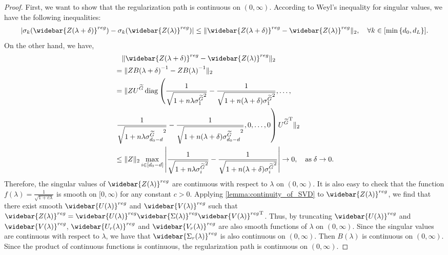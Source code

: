 \documentclass{article}
\newcommand{\T}{\mathrm{T}}
\theoremstyle{plain}
\theoremstyle{definition}
\theoremstyle{remark}
\theoremstyle{remark}
\begin{document}
\begin{proof}
      First, we want to show that the regularization path is continuous on $(0, \infty)$. According to Weyl's inequality for singular values, we have the following inequalities:
      \begin{align}
        |\sigma_k(\widebar{Z(\lambda+\delta)}^{reg})-\sigma_k(\widebar{Z(\lambda)}^{reg})| \leq \|\widebar{Z(\lambda+\delta)}^{reg}-\widebar{Z(\lambda)}^{reg}\|_{2}, \quad \forall k \in [\min{\{d_0, d_L\}}].
      \end{align}
      On the other hand, we have,
      \begin{align}
        &\quad \|\widebar{Z(\lambda+\delta)}^{reg}-\widebar{Z(\lambda)}^{reg}\|_{2} \\
        &= \|Z{B(\lambda+\delta)}^{-1}-Z{B(\lambda)}^{-1}\|_{2} \\
        &=  \|Z U^{\widetilde{G}} \operatorname*{diag}\left(\frac{1}{\sqrt{1+n\lambda {\sigma_1^{\widetilde{G}}}^2}}-\frac{1}{\sqrt{1+n(\lambda+\delta){\sigma_1^{\widetilde{G}}}^2}}, \dots, \right.\\
        & \left. \frac{1}{\sqrt{1+n\lambda {\sigma_{d_0-d}^{\widetilde{G}}}^2}}-\frac{1}{\sqrt{1+n(\lambda+\delta){\sigma_{d_0-d}^{\widetilde{G}}}^2}} , 0, \dots, 0\right) {U^{\widetilde{G}}}^{\T} \|_{2} \\
        &\leq \|Z\|_{2} \max_{i \in [d_0-d]} \left|\frac{1}{\sqrt{1+n\lambda {\sigma_i^{\widetilde{G}}}^2}}-\frac{1}{\sqrt{1+n(\lambda+\delta){\sigma_i^{\widetilde{G}}}^2}}\right| \rightarrow 0, \quad \text{as} \; \delta \rightarrow 0.
      \end{align}
      Therefore, the singular values of $\widebar{Z(\lambda)}^{reg}$ are continuous with respect to $\lambda$ on $(0, \infty)$. It is also easy to check that the function $f(\lambda) = \frac{1}{\sqrt{1+c\lambda}}$ is smooth on $[0, \infty)$ for any constant $c > 0$. Applying \autoref{lemma:continuity_of_SVD} to $\widebar{Z(\lambda)}^{reg}$, we find that there exist smooth $\widebar{U(\lambda)}^{reg}$ and $\widebar{V(\lambda)}^{reg}$ such that $\widebar{Z(\lambda)}^{reg} = \widebar{U(\lambda)}^{reg} \widebar{\Sigma(\lambda)}^{reg} {\widebar{V(\lambda)}^{reg}}^{\T}$. Thus, by truncating $\widebar{U(\lambda)}^{reg}$ and $\widebar{V(\lambda)}^{reg}$, $\widebar{U_r(\lambda)}^{reg}$ and $\widebar{V_r(\lambda)}^{reg}$ are also smooth functions of $\lambda$ on $(0, \infty)$. Since the singular values are continuous with respect to $\lambda$, we have that $\widebar{\Sigma_r(\lambda)}^{reg}$ is also continuous on $(0, \infty)$. Then $B(\lambda)$ is continuous on $(0, \infty)$. Since the product of continuous functions is continuous, the regularization path is continuous on $(0, \infty)$.


\end{proof}
\end{document}
